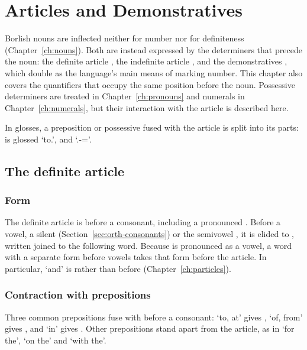 \chapter{Articles and Demonstratives}\label{ch:determiners}

Borlish nouns are inflected neither for number nor for definiteness (Chapter~\ref{ch:nouns}). Both are instead expressed by the determiners that precede the noun: the definite article , the indefinite article , and the demonstratives , which double as the language's main means of marking number. This chapter also covers the quantifiers that occupy the same position before the noun. Possessive determiners are treated in Chapter~\ref{ch:pronouns} and numerals in Chapter~\ref{ch:numerals}, but their interaction with the article is described here.

In glosses, a preposition or possessive fused with the article is split into its parts:  is glossed `to.\Def', and  `\First\Sg.\Poss-\Def='.

\section{The definite article}\label{sec:def-article}

\subsection{Form}
The definite article is   before a consonant, including a pronounced . Before a vowel, a silent  (Section~\ref{sec:orth-consonants}) or the semivowel , it is elided to  , written joined to the following word.
Because  is pronounced as a vowel, a word with a separate form before vowels takes that form before the article. In particular, `and' is  rather than  before  (Chapter~\ref{ch:particles}).

\subsection{Contraction with prepositions}\label{sec:art-contraction}
Three common prepositions fuse with  before a consonant:  `to, at' gives  ,  `of, from' gives  , and  `in' gives  . Other prepositions stand apart from the article, as in  `for the',  `on the' and  `with the'.

